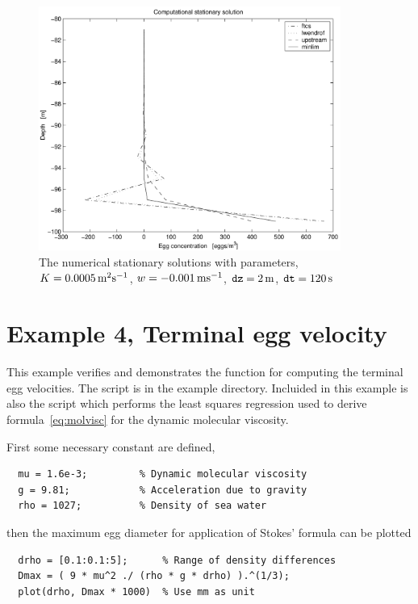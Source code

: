 \begin{figure}
\begin{center}
\includegraphics[height=8cm]{ex3d}
\end{center}
\caption{The numerical stationary solutions with parameters,
     $K = 0.0005 \, \mbox{m}^2 \mbox{s}^{-1}$, $w = -0.001 \, \mbox{m} \mbox{s}^{-1}$, ${\mbox{\texttt{dz}}} = 2 \, \mbox{m}$, 
     ${\mbox{\texttt{dt}}} = 120 \, \mbox{s}$}\label{fig:ex3d}
\end{figure}


\clearpage

\section{Example 4, Terminal egg velocity}

This example verifies and demonstrates the function  for
computing the terminal egg velocities.  The script is  in
the example directory. Incluided in this example is also the script
 which performs the least squares regression used to
derive formula~\eqref{eq:molvisc} for the dynamic molecular viscosity.

First some necessary constant are defined,
\begin{verbatim}
  mu = 1.6e-3;         % Dynamic molecular viscosity 
  g = 9.81;            % Acceleration due to gravity 
  rho = 1027;          % Density of sea water
\end{verbatim}
then the maximum egg diameter  for application of
Stokes' formula can be plotted
\begin{verbatim}
  drho = [0.1:0.1:5];      % Range of density differences 
  Dmax = ( 9 * mu^2 ./ (rho * g * drho) ).^(1/3); 
  plot(drho, Dmax * 1000)  % Use mm as unit 
\end{verbatim}

